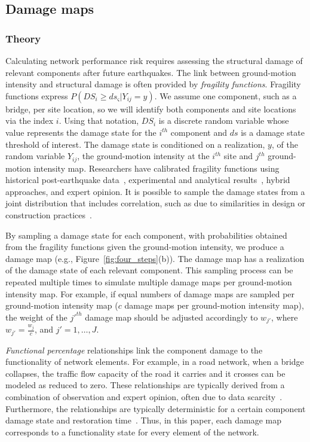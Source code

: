 \subsection{Damage maps}
\subsubsection{Theory}
Calculating network performance risk requires assessing the structural damage of relevant components after future earthquakes. The link between ground-motion intensity and structural damage is often provided by \emph{fragility functions}. Fragility functions express $P(DS_i \geq ds_{\varsigma} | Y_{ij} = y)$. We assume one component, such as a bridge, per site location, so we will identify both components and site locations via the index $i$. Using that notation, $DS_i$ is a discrete random variable whose value represents the damage state for the $i^{th}$ component and $ds$ is a damage state threshold of interest. The damage state is conditioned on a realization, $y$, of the random variable $Y_{ij}$, the ground-motion intensity at the $i^{th}$ site and $j^{th}$ ground-motion intensity map. Researchers have calibrated fragility functions using historical post-earthquake data~\cite[e.g.,][]{basoz_enhancement_1999}, experimental and analytical results~\cite[e.g.,][]{ramanathan_next_2012}, hybrid approaches, and expert opinion. It is possible to sample the damage states from  a joint distribution that includes correlation, such as due to similarities in design or construction practices~\cite[e.g.,][]{lee_uncertainty_2007}. 

By sampling a damage state for each component, with probabilities obtained from the fragility functions given the ground-motion intensity, we produce a damage map (e.g., Figure~\ref{fig:four_steps}{(b)}). The damage map has a realization of the damage state of each relevant component. This sampling process can be repeated multiple times to simulate multiple damage maps per ground-motion intensity map. For example, if equal numbers of damage maps are sampled per ground-motion intensity map ($c$ damage maps per ground-motion intensity map), the weight of the $j'^{th}$ damage map should be adjusted accordingly to $w_{j'}$, where $w_{j'} = \frac{w_j}{c}$, and $j' = 1, \ldots, J$. 

\emph{Functional percentage} relationships link the component damage to the functionality of network elements.  For example, in a road network, when a bridge collapses, the traffic flow capacity of the road it carries and it crosses can be modeled as reduced to zero. These relationships are typically derived from a combination of observation and expert opinion, often due to data scarcity~\cite{werner_redars_2006}. Furthermore, the relationships are typically deterministic for a certain component damage state and restoration time~\cite{werner_redars_2006}. Thus, in this paper, each damage map corresponds to a functionality state for every element of the network.

